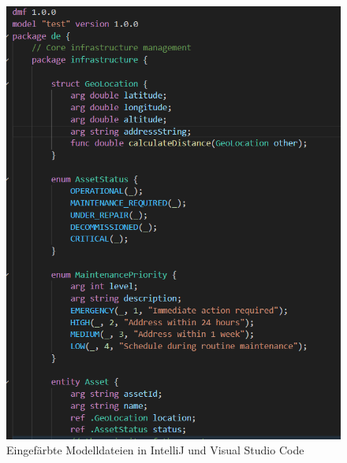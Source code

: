 \documentclass[./einleitung.tex]{subfiles}
\begin{document}
\begin{figure}[H]
        \includegraphics[width=\linewidth / 2 - 1em]{bilder/semanticVscode}
        \caption{Eingefärbte Modelldateien in IntelliJ und Visual Studio Code}
        \label{fig:semanticintellij}
        \vspace{-1em}
    \end{figure}
\end{document}
